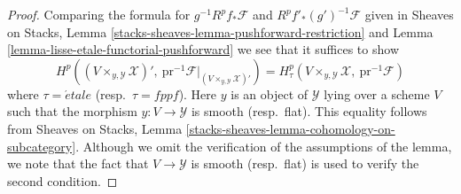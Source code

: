 \documentclass[10pt,a4paper]{amsart}
\theoremstyle{plain}
\theoremstyle{definition}
\theoremstyle{remark}
\numberwithin{equation}{subsection}
\def\etale{{\acute{e}tale}}
\begin{document}
\begin{proof}
Comparing the formula for $g^{-1}R^pf_*\mathcal{F}$
and $R^pf'_*(g')^{-1}\mathcal{F}$ given in
Sheaves on Stacks, Lemma \ref{stacks-sheaves-lemma-pushforward-restriction}
and Lemma \ref{lemma-lisse-etale-functorial-pushforward}
we see that it suffices to show
$$
H^p((V \times_{y, \mathcal{Y}} \mathcal{X})',
\ \text{pr}^{-1}\mathcal{F}|_{(V \times_{y, \mathcal{Y}} \mathcal{X})'})
=
H^p_\tau(V \times_{y, \mathcal{Y}} \mathcal{X},\ \text{pr}^{-1}\mathcal{F})
$$
where $\tau = \etale$ (resp.\ $\tau = fppf$). Here $y$ is an object
of $\mathcal{Y}$ lying over a scheme $V$ such that the morphism
$y : V \to \mathcal{Y}$ is smooth (resp.\ flat).
This equality follows from
Sheaves on Stacks, Lemma \ref{stacks-sheaves-lemma-cohomology-on-subcategory}.
Although we omit the verification of the assumptions
of the lemma, we note that the fact that $V \to \mathcal{Y}$ is smooth
(resp.\ flat) is used to verify the second condition.
\end{proof}
\end{document}
